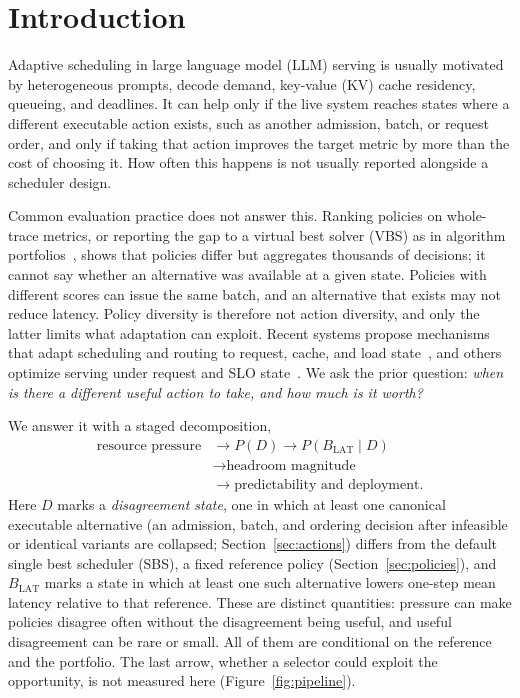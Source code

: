 \documentclass[preprint,12pt]{elsarticle}
\begin{document}
\section{Introduction}
\label{sec:introduction}

Adaptive scheduling in large language model (LLM) serving is usually motivated
by heterogeneous prompts, decode demand, key-value (KV) cache residency,
queueing, and deadlines. It can help only if the live system reaches states
where a different executable action exists, such as another admission, batch,
or request order, and only if taking that action improves the target metric by
more than the cost of choosing it. How often this happens is not usually
reported alongside a scheduler design.

Common evaluation practice does not answer this. Ranking policies on
whole-trace metrics, or reporting the gap to a virtual best solver (VBS) as in
algorithm portfolios~\cite{rice1976algorithmselection,gomes2001portfolios},
shows that policies differ but aggregates thousands of decisions; it cannot say
whether an alternative was available at a given state. Policies with different
scores can issue the same batch, and an alternative that exists may not reduce
latency. Policy diversity is therefore not action diversity, and only the latter
limits what adaptation can exploit. Recent systems propose mechanisms that adapt scheduling and routing to
request, cache, and load state~\cite{llumnix2024,preble2025,lmetric2026}, and
others optimize serving under request and SLO state~\cite{sola2025,jitserve2026,adaserve2026}. We ask the prior question: \emph{when is
there a different useful action to take, and how much is it worth?}

We answer it with a staged decomposition,
\begin{equation}
  \begin{aligned}
  \text{resource pressure}&\longrightarrow P(D)\longrightarrow
  P(B_{\mathrm{LAT}}\mid D)\\
  &\longrightarrow\text{headroom magnitude}\\
  &\longrightarrow\text{predictability and deployment}.
  \end{aligned}
  \label{eq:chain}
\end{equation}
Here $D$ marks a \emph{disagreement state}, one in which at least one canonical
executable alternative (an admission, batch, and ordering decision after
infeasible or identical variants are collapsed; Section~\ref{sec:actions})
differs from the default single best scheduler (SBS), a fixed reference policy
(Section~\ref{sec:policies}), and $B_{\mathrm{LAT}}$ marks a state in which at
least one such alternative lowers one-step mean latency relative to that
reference. These are distinct quantities: pressure can
make policies disagree often without the disagreement being useful, and useful
disagreement can be rare or small. All of them are conditional on the reference
and the portfolio. The last arrow, whether a selector could exploit the
opportunity, is not measured here (Figure~\ref{fig:pipeline}).
\end{document}
